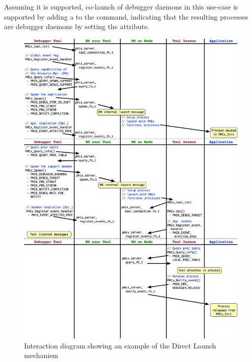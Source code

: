 Assuming it is supported, co-launch of debugger daemons in this use-case is supported by adding a  to the  command, indicating that the resulting processes are debugger daemons by setting the  attribute.

\begingroup
\begin{figure}
  \begin{center}
    \includegraphics[width=\textwidth,height=\textheight,keepaspectratio]{figs/direct-launch}
  \end{center}
  \caption{Interaction diagram showing an example of the Direct Launch mechanism}
  \label{fig:direct_launch}
\end{figure}
\endgroup



{\large {}}

